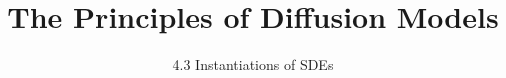 
\title{The Principles of Diffusion Models}
\subtitle{4.3 Instantiations of SDEs}


\begin{frame}
    \titlepage
\end{frame}



